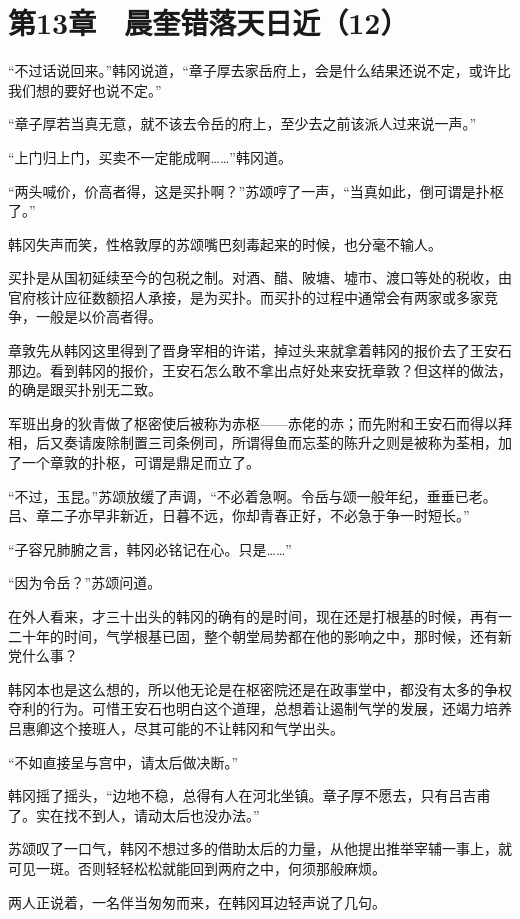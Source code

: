\section{第13章　晨奎错落天日近（12）}

“不过话说回来。”韩冈说道，“章子厚去家岳府上，会是什么结果还说不定，或许比我们想的要好也说不定。”

“章子厚若当真无意，就不该去令岳的府上，至少去之前该派人过来说一声。”

“上门归上门，买卖不一定能成啊……”韩冈道。

“两头喊价，价高者得，这是买扑啊？”苏颂哼了一声，“当真如此，倒可谓是扑枢了。”

韩冈失声而笑，性格敦厚的苏颂嘴巴刻毒起来的时候，也分毫不输人。

买扑是从国初延续至今的包税之制。对酒、醋、陂塘、墟市、渡口等处的税收，由官府核计应征数额招人承接，是为买扑。而买扑的过程中通常会有两家或多家竞争，一般是以价高者得。

章敦先从韩冈这里得到了晋身宰相的许诺，掉过头来就拿着韩冈的报价去了王安石那边。看到韩冈的报价，王安石怎么敢不拿出点好处来安抚章敦？但这样的做法，的确是跟买扑别无二致。

军班出身的狄青做了枢密使后被称为赤枢——赤佬的赤；而先附和王安石而得以拜相，后又奏请废除制置三司条例司，所谓得鱼而忘荃的陈升之则是被称为荃相，加了一个章敦的扑枢，可谓是鼎足而立了。

“不过，玉昆。”苏颂放缓了声调，“不必着急啊。令岳与颂一般年纪，垂垂已老。吕、章二子亦早非新近，日暮不远，你却青春正好，不必急于争一时短长。”

“子容兄肺腑之言，韩冈必铭记在心。只是……”

“因为令岳？”苏颂问道。

在外人看来，才三十出头的韩冈的确有的是时间，现在还是打根基的时候，再有一二十年的时间，气学根基已固，整个朝堂局势都在他的影响之中，那时候，还有新党什么事？

韩冈本也是这么想的，所以他无论是在枢密院还是在政事堂中，都没有太多的争权夺利的行为。可惜王安石也明白这个道理，总想着让遏制气学的发展，还竭力培养吕惠卿这个接班人，尽其可能的不让韩冈和气学出头。

“不如直接呈与宫中，请太后做决断。”

韩冈摇了摇头，“边地不稳，总得有人在河北坐镇。章子厚不愿去，只有吕吉甫了。实在找不到人，请动太后也没办法。”

苏颂叹了一口气，韩冈不想过多的借助太后的力量，从他提出推举宰辅一事上，就可见一斑。否则轻轻松松就能回到两府之中，何须那般麻烦。

两人正说着，一名伴当匆匆而来，在韩冈耳边轻声说了几句。

